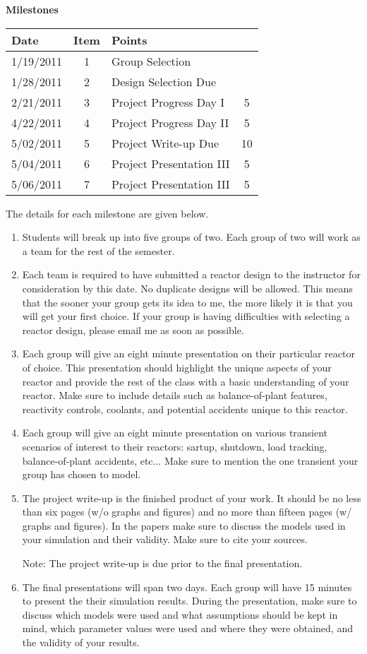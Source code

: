 \textbf{Milestones}
\begin{center}
\setlength{\extrarowheight}{1.5pt}
\begin{longtable}{lclc}
Date&	Item &	Points \\ \hline\hline
\endhead
1/19/2011 & 1 & Group Selection 			&  		\\
1/28/2011 &	2 & Design Selection Due 		& 		\\
2/21/2011 &	3 & Project Progress Day I 		& 5 	\\
4/22/2011 & 4 & Project Progress Day II		& 5 	\\ 
5/02/2011 & 5 & Project Write-up Due 		& 10	\\
5/04/2011 & 6 & Project Presentation III	& 5		\\
5/06/2011 & 7 & Project Presentation III	& 5		\\
\end{longtable}
\end{center}
The details for each milestone are given below.
\begin{enumerate}
\item{
Students will break up into five groups of two. Each group of two will work as a team for the rest of the semester.
}
\item{
Each team is required to have submitted a reactor design to the instructor for consideration by this date.
No duplicate designs will be allowed.
This means that the sooner your group gets its idea to me, the more likely it is that you will get your first choice.
If your group is having difficulties with selecting a reactor design, please email me as soon as possible.
}
\item{
Each group will give an eight minute presentation on their particular reactor of choice.
This presentation should highlight the unique aspects of your reactor and provide the rest of the class with a basic understanding of your reactor.
Make sure to include details such as balance-of-plant features, reactivity controls, coolants, and potential accidents unique to this reactor.
}
\item{
Each group will give an eight minute presentation on various transient scenarios of interest to their reactors: sartup, shutdown, load tracking, balance-of-plant accidents, etc... 
Make sure to mention the one transient your group has chosen to model.
}
\item{
The project write-up is the finished product of your work. It should be no less than six pages (w/o graphs and figures) and no more than fifteen pages (w/ graphs and figures).
In the papers make sure to discuss the models used in your simulation and their validity.
Make sure to cite your sources.

Note: The project write-up is due prior to the final presentation.
}
\item{
The final presentations will span two days. Each group will have 15 minutes to present the their simulation results.
During the presentation, make sure to discuss which models were used and what assumptions should be kept in mind, which parameter values were used and where they were obtained, and the validity of your results.
}
\end{enumerate}



